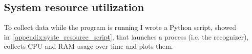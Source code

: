 \documentclass[../thesis.tex]{subfiles}
\begin{document}
\subsection{System resource utilization}\label{ss:system_resource_utilization}
To collect data while the program is running I wrote a Python script, showed in~\ref{appendix:syste_resource_script}, that launches a process (i.e. the recognizer), collects CPU and RAM usage over time and plots them.
\end{document}
